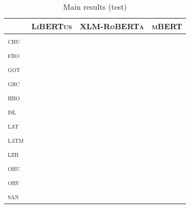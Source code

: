 \documentclass{../acl_latex.tex}
\begin{document}
\begin{table}[t]
\centering
\begin{tabular}{llll}
\toprule
                 & \textsc{LiBERTus} & \textsc{XLM-RoBERTa} &  \textsc{mBERT}  \\ \midrule
\textsc{chu}     &                   &                                         \\ 
\textsc{fro}     &                   &                                         \\
\textsc{got}     &                   &                                         \\
\textsc{grc}     &                   &                                         \\
\textsc{hbo}     &                   &                                         \\
\textsc{isl}     &                   &                                         \\
\textsc{lat}     &                   &                                         \\
\textsc{latm}    &                   &                                         \\
\textsc{lzh}     &                   &                                         \\
\textsc{ohu}     &                   &                                         \\
\textsc{orv}     &                   &                                         \\
\textsc{san}     &                   &                                         \\ \bottomrule 
\end{tabular}
\caption{
    Main results (test)
}
\end{table}
\end{document}
